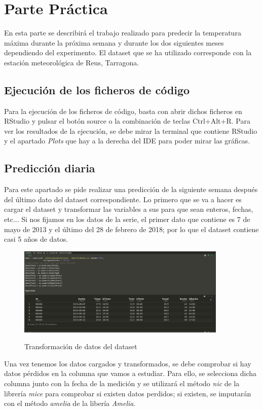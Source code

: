 \chapter{Parte Práctica}
En esta parte se describirá el trabajo realizado para predecir la temperatura máxima durante la próxima semana y durante los dos siguientes meses dependiendo del experimento. El dataset que se ha utilizado corresponde con la estación meteorológica de Reus, Tarragona.

\section{Ejecución de los ficheros de código}
Para la ejecución de los ficheros de código, basta con abrir dichos ficheros en RStudio y pulsar el botón source o la combinación de teclas Ctrl+Alt+R. Para ver los resultados de la ejecución, se debe mirar la terminal que contiene RStudio y el apartado \textit{Plots} que hay a la derecha del IDE para poder mirar las gráficas.

\section{Predicción diaria}
Para este apartado se pide realizar una predicción de la siguiente semana después del último dato del dataset correspondiente. Lo primero que se va a hacer es cargar el dataset y transformar las variables a sus para que sean enteros, fechas, etc... Si nos fijamos en los datos de la serie, el primer dato que contiene es 7 de mayo de 2013 y el último del 28 de febrero de 2018; por lo que el dataset contiene casi 5 años de datos.

\begin{figure}[H]
	\centering
	\includegraphics[width=100mm]{imagenes/initial_prep.png}
	\label{fig:1}
	\caption{Transformación de datos del dataset}
\end{figure}

Una vez tenemos los datos cargados y transformados, se debe comprobar si hay datos pérdidos en la columna que vamos a estudiar. Para ello, se selecciona dicha columna junto con la fecha de la medición y se utilizará el método \textit{nic} de la librería \textit{mice} para comprobar si existen datos perdidos; si existen, se imputarán con el método \textit{amelia} de la libería \textit{Amelia}.


